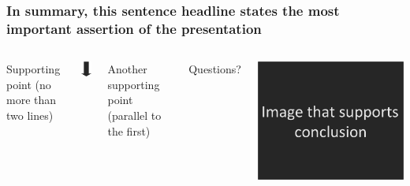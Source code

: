 \documentclass{beamer}
\begin{document}
\begin{frame}
\frametitle{In summary, this sentence headline states the most important assertion of the presentation}

\begin{columns}
Supporting point (no more than
two lines)




\centerline{\includegraphics[width=0.05\linewidth]{fig-talk/down_arrow.png}}



Another supporting point
(parallel to the first)



\vspace{3mm}




\vspace{3mm}


\pause
Questions?

\centerline{\includegraphics[width=0.9\linewidth]{fig-talk/conclusion_image.png}}



\end{columns}






\end{frame}
\end{document}
